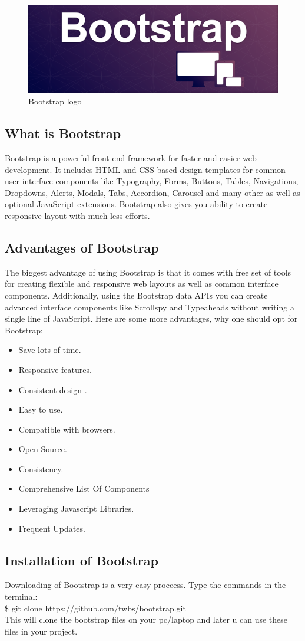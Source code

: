 \begin{figure}[h]
\centering \includegraphics[scale=0.3]{images/bootstrap.png}
\caption{Bootstrap logo}
\end{figure}
\subsection{What is Bootstrap}
\noindent Bootstrap is a powerful front-end framework for faster and easier web development. It includes HTML and CSS based design templates for common user interface components like Typography, Forms, Buttons, Tables, Navigations, Dropdowns, Alerts, Modals, Tabs, Accordion, Carousel and many other as well as optional JavaScript extensions.
Bootstrap also gives you ability to create responsive layout with much less efforts.
\subsection{Advantages of Bootstrap}
The biggest advantage of using Bootstrap is that it comes with free set of tools for creating flexible and responsive web layouts as well as common interface components.
Additionally, using the Bootstrap data APIs you can create advanced interface components like Scrollspy and Typeaheads without writing a single line of JavaScript.
Here are some more advantages, why one should opt for Bootstrap:
\begin{itemize}
\item Save lots of time.
\item Responsive features.
\item Consistent design .
\item Easy to use.
\item Compatible with browsers.
\item Open Source.
\item Consistency.
\item Comprehensive List Of Components
\item Leveraging Javascript Libraries.
\item Frequent Updates.
\end{itemize}
\subsection{Installation of Bootstrap}
Downloading of Bootstrap is a very easy proccess.
Type the commands in the terminal:\\

 \$ git clone https://github.com/twbs/bootstrap.git\\


\noindent This will clone the bootstrap files on your pc/laptop and later u can use these files in your project.

